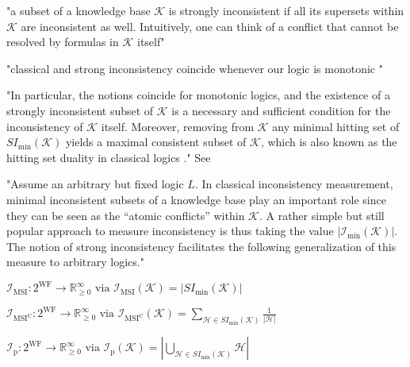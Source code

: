 "a subset of a knowledge base \(\mathcal{K}\) is strongly inconsistent if all its supersets within \(\mathcal{K}\) are inconsistent as well. Intuitively, one can think of a conflict that cannot be resolved by formulas in \(\mathcal{K}\) itself"

"classical and strong inconsistency coincide whenever our logic is monotonic \cite{brewka_strong_2019}"

"In particular, the notions coincide for monotonic logics, and the existence of a strongly inconsistent subset of \(\mathcal{K}\) is a necessary and sufficient condition for the inconsistency of \(\mathcal{K}\) itself. Moreover, removing from \(\mathcal{K}\) any minimal hitting set of \(SI_{\min}(\mathcal{K})\) yields a maximal consistent subset of \(\mathcal{K}\), which is also known as the hitting set duality in classical logics \cite{reiter_theory_1987}." See \cite{brewka_strong_2017}

"Assume an arbitrary but fixed logic \(L\). In classical inconsistency measurement, minimal inconsistent subsets of a knowledge base play an important role since they can be seen as the “atomic conflicts” within \(\mathcal{K}\). A rather simple but still popular approach to measure inconsistency is thus taking the value \(\left| \mathcal{I}_{\min}(\mathcal{K}) \right|\). The notion of strong inconsistency facilitates the following generalization of this measure to arbitrary logics."

\(\mathcal{I}_{\text{MSI}}: 2^{\text{WF}} \rightarrow \mathbb{R}_{\geq 0}^{\infty} \text{ via } \mathcal{I}_{\text{MSI}}(\mathcal{K}) = \left| SI_{\min}(\mathcal{K}) \right|\)

\(\mathcal{I}_{\text{MSI}^\text{C}}: 2^{\text{WF}} \rightarrow \mathbb{R}_{\geq 0}^{\infty} \text{ via } \mathcal{I}_{\text{MSI}^\text{C}}(\mathcal{K}) = \sum_{\mathcal{H} \in SI_{\min}(\mathcal{K})} \frac{1}{|\mathcal{H}|}\)
\cite{hunter_measuring_2008}

\(\mathcal{I}_{\text{p}}: 2^{\text{WF}} \rightarrow \mathbb{R}_{\geq 0}^{\infty} \text{ via } \mathcal{I}_{\text{p}}(\mathcal{K}) = \left| \bigcup_{\mathcal{H} \in SI_{\min}(\mathcal{K})} \mathcal{H} \right|\)
\cite{liu_measuring_2011}

